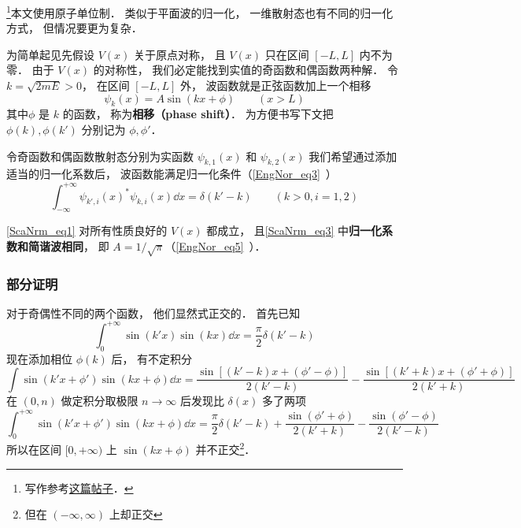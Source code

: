 
\footnote{写作参考\href{https://chaoli.club/index.php/4541/last}{这篇帖子}．}本文使用原子单位制． 类似于平面波的归一化， 一维散射态也有不同的归一化方式， 但情况要更为复杂． 

为简单起见先假设 $V(x)$ 关于原点对称， 且 $V(x)$ 只在区间 $[-L,L]$ 内不为零． 由于 $V(x)$ 的对称性， 我们必定能找到实值的奇函数和偶函数两种解． 令 $k = \sqrt{2mE} > 0$， 在区间 $[-L,L]$ 外， 波函数就是正弦函数加上一个相移
\begin{equation}\label{ScaNrm_eq3}
\psi_k(x) = A\sin(kx + \phi) \qquad (x > L)
\end{equation}
其中$\phi$ 是 $k$ 的函数， 称为\textbf{相移（phase shift）}． 为方便书写下文把 $\phi(k),\phi(k')$ 分别记为 $\phi, \phi'$．

令奇函数和偶函数散射态分别为实函数 $\psi_{k,1}(x)$ 和 $\psi_{k,2}(x)$ 我们希望通过添加适当的归一化系数后， 波函数能满足归一化条件（\autoref{EngNor_eq3}~）
\begin{equation}\label{ScaNrm_eq1}
\int_{-\infty}^{+\infty} \psi_{k',i}(x)^* \psi_{k,i}(x) \dd{x} = \delta(k' - k) \qquad (k > 0, i = 1, 2)
\end{equation}

\begin{theorem}{}
\autoref{ScaNrm_eq1} 对所有性质良好的 $V(x)$ 都成立， 且\autoref{ScaNrm_eq3} 中\textbf{归一化系数和简谐波相同}， 即 $A = 1/\sqrt{\pi}$（\autoref{EngNor_eq5}~）．
\end{theorem}

\subsubsection{部分证明}
对于奇偶性不同的两个函数， 他们显然式正交的． 首先已知
\begin{equation}
\int_{0}^{+\infty} \sin(k'x)\sin(kx)\dd{x} = \frac{\pi}{2}\delta(k'-k)
\end{equation}
现在添加相位 $\phi(k)$ 后， 有不定积分
\begin{equation}
\int \sin(k'x+\phi')\sin(kx+\phi) \dd{x} = \frac{\sin[(k'-k)x + (\phi'-\phi)]}{2(k'-k)}
- \frac{\sin[(k'+k)x+(\phi'+\phi)]}{2(k'+k)}
\end{equation}
在 $(0,n)$ 做定积分取极限 $n\to\infty$ 后发现比 $\delta(x)$ 多了两项
\begin{equation}
\int_{0}^{+\infty} \sin(k'x+\phi')\sin(kx+\phi) \dd{x} = \frac{\pi}{2}\delta(k'-k)
+ \frac{\sin(\phi'+\phi)}{2(k'+k)} - \frac{\sin(\phi'-\phi)}{2(k'-k)}
\end{equation}
所以在区间 $[0, +\infty)$ 上 $\sin(kx+\phi)$ 并不正交\footnote{但在 $(-\infty,\infty)$ 上却正交}．

